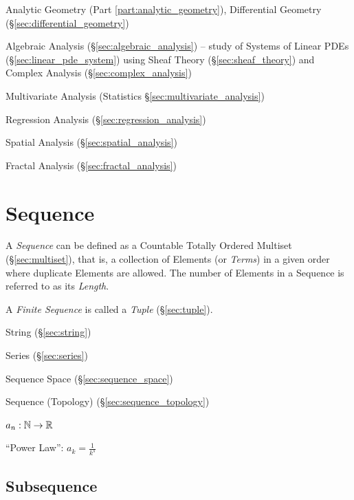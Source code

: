 \fist Analytic Geometry (Part \ref{part:analytic_geometry}), Differential
Geometry (\S\ref{sec:differential_geometry})

\fist Algebraic Analysis (\S\ref{sec:algebraic_analysis}) -- study of Systems of
Linear PDEs (\S\ref{sec:linear_pde_system}) using Sheaf Theory
(\S\ref{sec:sheaf_theory}) and Complex Analysis (\S\ref{sec:complex_analysis})

\fist Multivariate Analysis (Statistics \S\ref{sec:multivariate_analysis})

\fist Regression Analysis (\S\ref{sec:regression_analysis})

\fist Spatial Analysis (\S\ref{sec:spatial_analysis})

\fist Fractal Analysis (\S\ref{sec:fractal_analysis})



\section{Sequence}\label{sec:sequence}

A \emph{Sequence} can be defined as a Countable Totally Ordered
Multiset (\S\ref{sec:multiset}), that is, a collection of Elements (or
\emph{Terms}) in a given order where duplicate Elements are allowed.
The number of Elements in a Sequence is referred to as its
\emph{Length}.

A \emph{Finite Sequence} is called a \emph{Tuple} (\S\ref{sec:tuple}).

String (\S\ref{sec:string})

Series (\S\ref{sec:series})

Sequence Space (\S\ref{sec:sequence_space})

Sequence (Topology) (\S\ref{sec:sequence_topology})

$a_n : \mathbb{N} \rightarrow \mathbb{R}$

``Power Law'': $a_k = \frac{1}{k^s}$



\subsection{Subsequence}\label{sec:subsequence}

